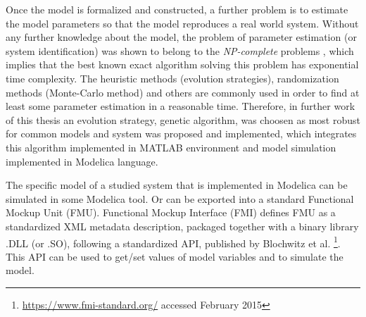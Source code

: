 Once the model is formalized and constructed, a further problem is to estimate the model parameters so that the model reproduces a real world system. Without any further knowledge about the model, the problem of parameter estimation (or system identification) was shown to belong to the \emph{NP-complete} problems \cite{Hofmann2005}, which implies that the best known exact algorithm solving this problem has exponential time complexity. The heuristic methods (evolution strategies), randomization methods (Monte-Carlo method) and others are commonly used in order to find at least some parameter estimation in a reasonable time. Therefore, in further  work of this thesis an evolution strategy, genetic algorithm, was choosen as most robust for common models and system was proposed and implemented, which integrates this algorithm implemented in MATLAB environment and model simulation implemented in Modelica language.

The specific model of a studied system that is implemented in Modelica can be simulated in some Modelica tool. Or can be exported into a standard Functional Mockup Unit (FMU). Functional Mockup Interface (FMI) defines FMU as a standardized XML metadata description, packaged together with a binary library .DLL (or .SO), following a standardized API, published by Blochwitz et al. \cite{Blochwitza}\footnote{\url{https://www.fmi-standard.org/} accessed February 2015}. This API can be used to get/set values of model variables and to simulate the model.


%



